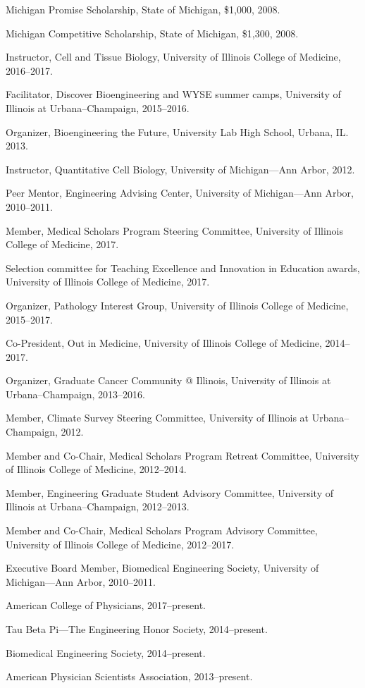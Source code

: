 \documentclass[11pt,article,oneside]{memoir}
\begin{document}
\ind Michigan Promise Scholarship, State of Michigan, \$1,000, 2008.

\ind Michigan Competitive Scholarship, State of Michigan, \$1,300, 2008.

\bigskip\bigskip


\ind Instructor, Cell and Tissue Biology, University of Illinois College of Medicine, 2016--2017.

\ind Facilitator, Discover Bioengineering and WYSE summer camps, University of Illinois at Urbana--Champaign, 2015--2016.

\ind Organizer, Bioengineering the Future, University Lab High School, Urbana, IL. 2013.

\ind Instructor, Quantitative Cell Biology, University of Michigan---Ann Arbor, 2012.

\ind Peer Mentor, Engineering Advising Center, University of Michigan---Ann Arbor, 2010--2011.

\bigskip


\ind Member, Medical Scholars Program Steering Committee, University of Illinois College of Medicine, 2017.

\ind Selection committee for Teaching Excellence and Innovation in Education awards, University of Illinois College of Medicine, 2017.

\ind Organizer, Pathology Interest Group, University of Illinois College of Medicine, 2015--2017.

\ind Co-President, Out in Medicine, University of Illinois College of Medicine, 2014--2017.

\ind Organizer, Graduate Cancer Community @ Illinois, University of Illinois at Urbana--Champaign, 2013--2016.

\ind Member, Climate Survey Steering Committee, University of Illinois at Urbana--Champaign, 2012.

\ind Member and Co-Chair, Medical Scholars Program Retreat Committee, University of Illinois College of Medicine, 2012--2014.

\ind Member, Engineering Graduate Student Advisory Committee, University of Illinois at Urbana--Champaign, 2012--2013.

\ind Member and Co-Chair, Medical Scholars Program Advisory Committee, University of Illinois College of Medicine, 2012--2017.

\ind Executive Board Member, Biomedical Engineering Society, University of Michigan---Ann Arbor, 2010--2011.

\bigskip


\ind American College of Physicians, 2017--present.

\ind Tau Beta Pi---The Engineering Honor Society, 2014--present.

\ind Biomedical Engineering Society, 2014--present.

\ind American Physician Scientists Association, 2013--present.
\end{document}
